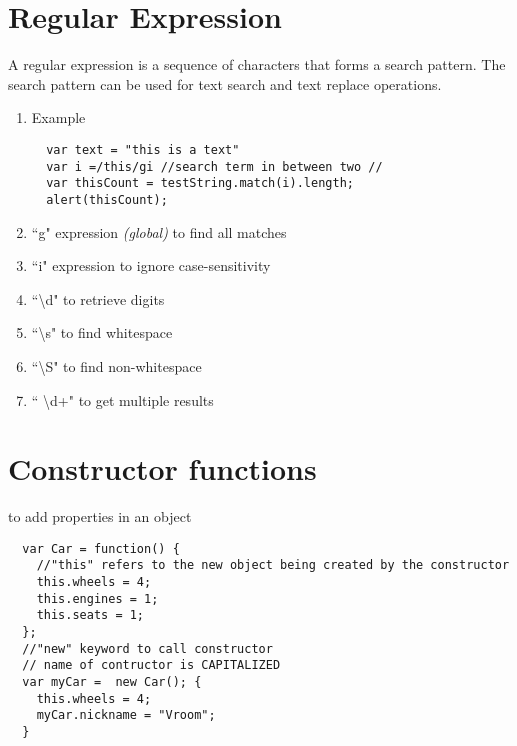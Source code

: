 \documentclass{article}
\begin{document}
\section{Regular Expression}
A regular expression is a sequence of characters that forms a search pattern. The search pattern can be used for text search and text replace operations.
\begin{enumerate}
\item Example
\begin{lstlisting}
  var text = "this is a text"
  var i =/this/gi //search term in between two //
  var thisCount = testString.match(i).length;
  alert(thisCount);
\end{lstlisting}
\item ``g" expression \emph{(global)}
to find all matches
\item ``i" expression
to ignore case-sensitivity
\item  ``\textbackslash d"
to retrieve digits
\item ``\textbackslash s"
to find whitespace
\item  ``\textbackslash S"
to find non-whitespace
\item {`` \textbackslash d+"}
to get multiple results
\end{enumerate}
\section{Constructor functions}
to add properties in an object
\begin{lstlisting}
  var Car = function() {
    //"this" refers to the new object being created by the constructor
    this.wheels = 4;
    this.engines = 1;
    this.seats = 1;
  };
  //"new" keyword to call constructor
  // name of contructor is CAPITALIZED
  var myCar =  new Car(); {
    this.wheels = 4;
    myCar.nickname = "Vroom";
  }
\end{lstlisting}
\end{document}
